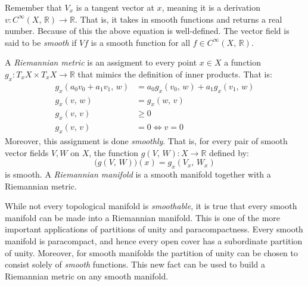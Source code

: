 \documentclass{article}
\theoremstyle{plain}
\theoremstyle{normal}
\begin{document}
        Remember that $V_{x}$ is a tangent vector at $x$, meaning it is a
        derivation $v:C^{\infty}(X,\,\mathbb{R})\rightarrow\mathbb{R}$. That is,
        it takes in smooth functions and returns a real number. Because of this
        the above equation is well-defined.
        The vector field is said to be \textit{smooth} if $Vf$ is a smooth
        function for all $f\in{C}^{\infty}(X,\,\mathbb{R})$.
        \par\hfill\par
        A \textit{Riemannian metric} is an assigment to every point
        $x\in{X}$ a function $g_{x}:T_{x}X\times{T}_{x}X\rightarrow\mathbb{R}$
        that mimics the definition of inner products. That is:
        \begin{align}
            g_{x}(a_{0}v_{0}+a_{1}v_{1},\,w)
            &=a_{0}g_{x}(v_{0},\,w)+a_{1}g_{x}(v_{1},\,w)\tag{Linearity}\\
            g_{x}(v,\,w)&=g_{x}(w,\,v)\tag{Symmetry}\\
            g_{x}(v,\,v)&\geq{0}\tag{Positivity}\\
            g_{x}(v,\,v)&=0\Leftrightarrow{v}=0\tag{Definiteness}
        \end{align}
        Moreover, this assignment is done \textit{smoothly}. That is,
        for every pair of smooth vector fields $V,W$ on $X$, the function
        $g(V,\,W):X\rightarrow\mathbb{R}$ defined by:
        \begin{equation}
            \big(g(V,\,W)\big)(x)=g_{x}(V_{x},\,W_{x})
        \end{equation}
        is smooth. A \textit{Riemannian manifold} is a smooth manifold together
        with a Riemannian metric.
        \par\hfill\par
        While not every topological manifold is \textit{smoothable}, it is true
        that every smooth manifold can be made into a Riemannian manifold. This
        is one of the more important applications of partitions of unity and
        paracompactness. Every smooth manifold is paracompact, and hence every
        open cover has a subordinate partition of unity. Moreover, for smooth
        manifolds the partition of unity can be chosen to consist solely of
        \textit{smooth} functions. This new fact can be used to build a
        Riemannian metric on any smooth manifold.
\end{document}
